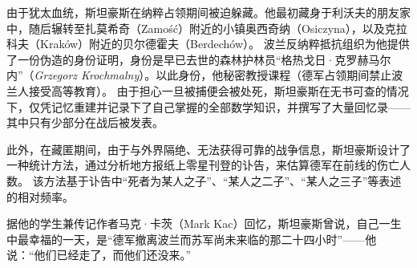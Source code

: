 由于犹太血统，斯坦豪斯在纳粹占领期间被迫躲藏。他最初藏身于利沃夫的朋友家中，随后辗转至扎莫希奇（Zamość）附近的小镇奥西奇纳（Osiczyna），以及克拉科夫（Kraków）附近的贝尔德霍夫（Berdechów）。\cite{7,8}  
波兰反纳粹抵抗组织为他提供了一份伪造的身份证明，身份是早已去世的森林护林员“格热戈日·克罗赫马尔内”（\emph{Grzegorz Krochmalny}）。以此身份，他秘密教授课程（德军占领期间禁止波兰人接受高等教育）。  
由于担心一旦被捕便会被处死，斯坦豪斯在无书可查的情况下，仅凭记忆重建并记录下了自己掌握的全部数学知识，并撰写了大量回忆录——其中只有少部分在战后被发表。\cite{8}

此外，在藏匿期间，由于与外界隔绝、无法获得可靠的战争信息，斯坦豪斯设计了一种统计方法，通过分析地方报纸上零星刊登的讣告，来估算德军在前线的伤亡人数。  
该方法基于讣告中“死者为某人之子”、“某人之二子”、“某人之三子”等表述的相对频率。\cite{8}

据他的学生兼传记作者马克·卡茨（Mark Kac）回忆，斯坦豪斯曾说，自己一生中最幸福的一天，是“德军撤离波兰而苏军尚未来临的那二十四小时”——他说：“他们已经走了，而他们还没来。”\cite{8}
